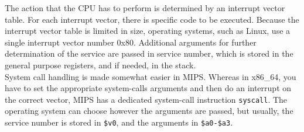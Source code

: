The action that the CPU has to perform is determined by an interrupt vector
table. For each interrupt vector, there is specific code to be executed.
Because the interrupt vector table is limited in size, operating systems, such
as Linux, use a single interrupt vector number 0x80. Additional arguments for
further determination of the service are passed in service number, which is
stored in the general purpose registers, and if needed, in the stack.\\
System call handling is made somewhat easier in MIPS. Whereas in x86\_64, you
have to set the appropriate system-calls arguments and then do an interrupt on
the correct vector, MIPS has a dedicated system-call instruction
\texttt{syscall}. The operating system can choose however the arguments are
passed, but usually, the service number is stored in \texttt{\$v0}, and the
arguments in \texttt{\$a0-\$a3}\cite{COD5}.






